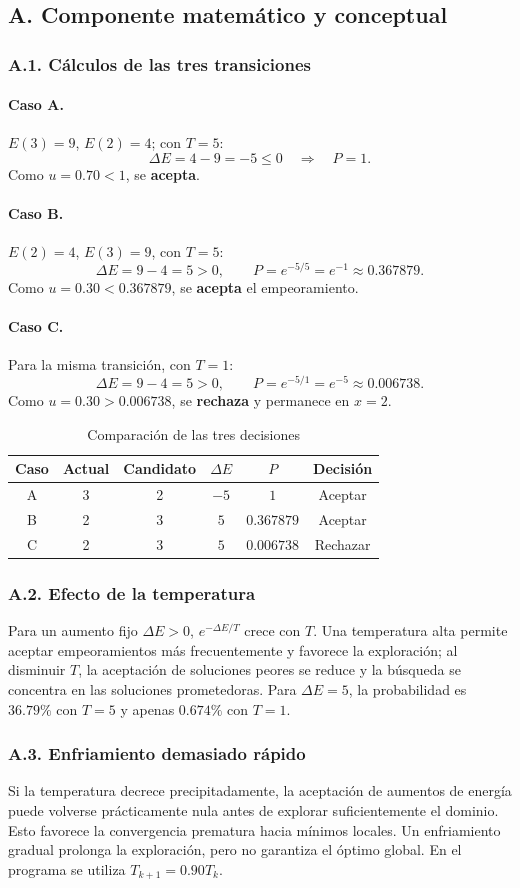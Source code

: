 \documentclass[11pt,a4paper]{article}
\begin{document}
\subsection{A. Componente matemático y conceptual}
\subsubsection{A.1. Cálculos de las tres transiciones}
\paragraph{Caso A.} $E(3)=9$, $E(2)=4$; con $T=5$:
\[\Delta E=4-9=-5\le0\quad\Rightarrow\quad P=1.\]
Como $u=0.70<1$, se \textbf{acepta}.
\paragraph{Caso B.} $E(2)=4$, $E(3)=9$, con $T=5$:
\[\Delta E=9-4=5>0,\qquad P=e^{-5/5}=e^{-1}\approx0.367879.\]
Como $u=0.30<0.367879$, se \textbf{acepta} el empeoramiento.
\paragraph{Caso C.} Para la misma transición, con $T=1$:
\[\Delta E=9-4=5>0,\qquad P=e^{-5/1}=e^{-5}\approx0.006738.\]
Como $u=0.30>0.006738$, se \textbf{rechaza} y permanece en $x=2$.
\begin{table}[H]\centering\caption{Comparación de las tres decisiones}\begin{tabular}{cccccc}\toprule Caso & Actual & Candidato & $\Delta E$ & $P$ & Decisión\\\midrule A&3&2&$-5$&$1$&Aceptar\\ B&2&3&$5$&$0.367879$&Aceptar\\ C&2&3&$5$&$0.006738$&Rechazar\\\bottomrule\end{tabular}\end{table}
\subsubsection{A.2. Efecto de la temperatura}
Para un aumento fijo $\Delta E>0$, $e^{-\Delta E/T}$ crece con $T$. Una temperatura alta permite aceptar empeoramientos más frecuentemente y favorece la exploración; al disminuir $T$, la aceptación de soluciones peores se reduce y la búsqueda se concentra en las soluciones prometedoras. Para $\Delta E=5$, la probabilidad es $36.79\%$ con $T=5$ y apenas $0.674\%$ con $T=1$.
\subsubsection{A.3. Enfriamiento demasiado rápido}
Si la temperatura decrece precipitadamente, la aceptación de aumentos de energía puede volverse prácticamente nula antes de explorar suficientemente el dominio. Esto favorece la convergencia prematura hacia mínimos locales. Un enfriamiento gradual prolonga la exploración, pero no garantiza el óptimo global. En el programa se utiliza $T_{k+1}=0.90T_k$.
\end{document}
